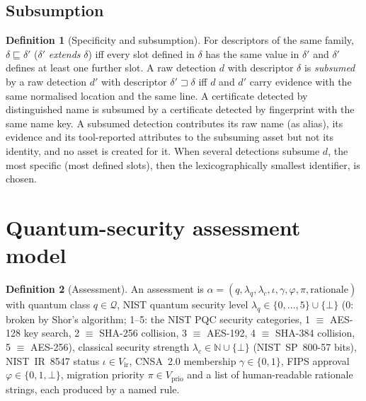 \documentclass[11pt,a4paper]{article}
\newcommand{\Q}{\mathcal{Q}}
\theoremstyle{definition}
\newtheorem{definition}{Definition}[section]
\theoremstyle{plain}
\begin{document}
\subsection{Subsumption}
\begin{definition}[Specificity and subsumption]\label{def:subsume}
For descriptors of the same family, $\delta \sqsubseteq \delta'$ ($\delta'$ \emph{extends}
$\delta$) iff every slot defined in $\delta$ has the same value in $\delta'$ and $\delta'$ defines
at least one further slot. A raw detection $d$ with descriptor $\delta$ is \emph{subsumed} by a
raw detection $d'$ with descriptor $\delta' \sqsupset \delta$ iff $d$ and $d'$ carry evidence
with the same normalised location and the same line. A certificate detected by distinguished
name is subsumed by a certificate detected by fingerprint with the same name key. A subsumed
detection contributes its raw name (as alias), its evidence and its tool-reported attributes to
the subsuming asset but not its identity, and no asset is created for it. When several
detections subsume $d$, the most specific (most defined slots), then the lexicographically
smallest identifier, is chosen.
\end{definition}

\section{Quantum-security assessment model}\label{sec:assessment}
\begin{definition}[Assessment]\label{def:assessment}
An assessment is $\alpha = (q, \lambda_q, \lambda_c, \iota, \gamma, \varphi, \pi, \mathrm{rationale})$
with quantum class $q \in \Q$, NIST quantum security level $\lambda_q \in \{0,\dots,5\}\cup\{\bot\}$
(0: broken by Shor's algorithm; 1--5: the NIST PQC security categories, 1 $\equiv$ AES-128 key
search, 2 $\equiv$ SHA-256 collision, 3 $\equiv$ AES-192, 4 $\equiv$ SHA-384 collision,
5 $\equiv$ AES-256), classical security strength $\lambda_c \in \mathbb{N}\cup\{\bot\}$
(NIST~SP~800-57 bits), NIST~IR~8547 status $\iota \in V_{\mathrm{ir}}$, CNSA~2.0 membership
$\gamma \in \{0,1\}$, FIPS approval $\varphi \in \{0,1,\bot\}$, migration priority
$\pi \in V_{\mathrm{prio}}$ and a list of human-readable rationale strings, each produced by a
named rule.
\end{definition}
\end{document}
